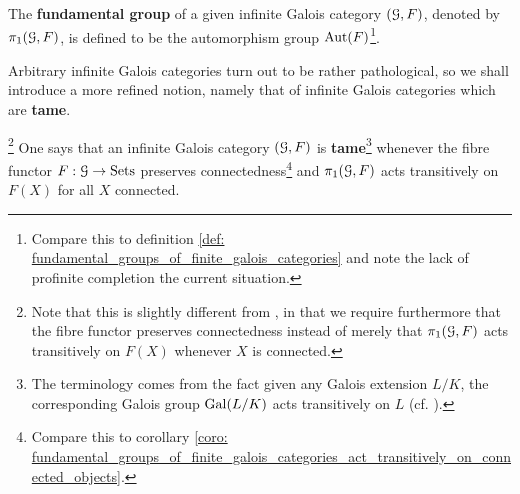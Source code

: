                 \begin{definition} \label{def: fundamental_groups_of_infinite_galois_categories}
                    The \textbf{fundamental group} of a given infinite Galois category $(\mathcal{G}, F)$, denoted by $\pi_1(\mathcal{G}, F)$, is defined to be the automorphism group $\mathrm{Aut}(F)$\footnote{Compare this to definition \ref{def: fundamental_groups_of_finite_galois_categories} and note the lack of profinite completion the current situation.}.
                \end{definition}
                Arbitrary infinite Galois categories turn out to be rather pathological, so we shall introduce a more refined notion, namely that of infinite Galois categories which are \textbf{tame}.  
                \begin{definition} \label{def: tame_infinite_galois_categories}
                    \footnote{Note that this is slightly different from \cite[Definition 7.2.4]{bhatt_scholze_2014_pro_etale}, in that we require furthermore that the fibre functor preserves connectedness instead of merely that $\pi_1(\mathcal{G}, F)$ acts transitively on $F(X)$ whenever $X$ is connected.} One says that an infinite Galois category $(\mathcal{G}, F)$ is \textbf{tame}\footnote{The terminology comes from the fact given any Galois extension $L/K$, the corresponding Galois group $\mathrm{Gal}(L/K)$ acts transitively on $L$ (cf. \cite[Proposition I.9.1]{neukirch_2010_algebraic_number_theory}).} whenever the fibre functor $F: \mathcal{G} \to \mathrm{Sets}$ preserves connectedness\footnote{Compare this to corollary \ref{coro: fundamental_groups_of_finite_galois_categories_act_transitively_on_connected_objects}.} and $\pi_1(\mathcal{G}, F)$ acts transitively on $F(X)$ for all $X$ connected.
                \end{definition}
                
